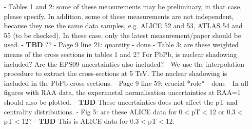 \documentclass[a4paper,11pt]{article}
\begin{document}
- Tables 1 and 2: some of these measurements may be preliminary, in that case, please specify. In addition, some of these
measurements are not independent, because they use the same data samples, e.g. ALICE 52 and 53, ATLAS 54 and 55 (to be checked).
In these case, only the latest measurement/paper should be used. \newline
- {\color{red} \textbf{TBD} ??}\newline
- Page 9 line 21: quantity \newline
- {\color{blue} done}\newline
- Table 3: are these weighted means of the cross sections in tables 1 and 2? For PbPb, is nuclear shadowing included? Are the EPS09
uncertainties also included? \newline
- {\color{blue} We use the interpolation procedure to extract the cross-sections at 5 TeV. The nuclear shadowing is included in the
PbPb cross sections.}\newline
- Page 9 line 59: crucial *role* \newline
- {\color{blue} done}\newline
- In all figures with RAA data, the experimetal normalisation uncertainties at RAA=1 should also be plotted.\newline 
- {\color{red} \textbf{TBD} These uncertainties does not affect the pT and centrality distributions.}\newline
- Fig 5: are these ALICE data for 0$<$pT$<$12 or 0.3$<$pT$<$12?\newline
- {\color{red} \textbf{TBD} This is ALICE data for 0.3$<$pT$<$12.}\newline










\noindent
\begin{thebibliography}{100}
\medskip



  
\end{thebibliography}
\end{document}
